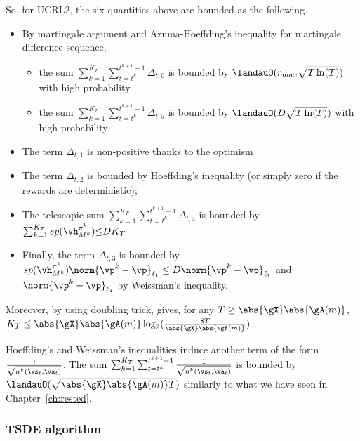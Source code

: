 So, for UCRL2, the six quantities above are bounded as the following.
\begin{itemize}
    \item By martingale argument and Azuma-Hoeffding's inequality for martingale difference sequence,
        \begin{itemize}
            \item the sum $\sum_{k=1}^{K_T}\sum_{t=t^k}^{t^{k+1}-1}\Delta_{t,0}$ is bounded by $\landauO(r_{max}\sqrt{T\ln(T)})$ with high probability
            \item the sum $\sum_{k=1}^{K_T}\sum_{t=t^k}^{t^{k+1}-1}\Delta_{t,5}$ is bounded by $\landauO(D\sqrt{T\ln(T)})$ with high probability
        \end{itemize}
    \item \label{it:optimism} The term $\Delta_{t,1}$ is non-positive thanks to the optimism
    \item The term $\Delta_{t,2}$ is bounded by Hoeffding's inequality (or simply zero if the rewards are deterministic);
    \item The telescopic sum $\sum_{k=1}^{K_T}\sum_{t=t^k}^{t^{k+1}-1} \Delta_{t,4}$ is bounded by $\sum_{k=1}^{K_T} sp(\vh^{\pi^k}_{M^k}){\le} DK_T$
    \item Finally, the term $\Delta_{t,3}$ is bounded by $sp(\vh^{\pi^k}_{M^k}) \norm{\vp^k-\vp}_{\ell_1}\le D\norm{\vp^k-\vp}_{\ell_1}$ and $\norm{\vp^k-\vp}_{\ell_1}$ by Weissman's inequality.
\end{itemize}
Moreover, by using doubling trick, \cite[Proposition~18]{jaksch2010near} gives, for any $T\ge \abs{\gX}\abs{\gA(m)}$, $K_T\le \abs{\gX}\abs{\gA(m)}\log_2(\frac{8T}{\abs{\gX}\abs{\gA(m)}})$.

Hoeffding's and Weissman's inequalities induce another term of the form $\frac{1}{\sqrt{n^k(\vs_t,\va_t)}}$.
The sum $\sum_{k=1}^{K_T}\sum_{t=t^k}^{t^{k+1}-1}\frac{1}{\sqrt{n^k(\vs_t,\va_t)}}$ is bounded by $\landauO(\sqrt{\abs{\gX}\abs{\gA(m)}T})$ similarly to what we have seen in Chapter~\ref{ch:rested}. %

\subsubsection{TSDE algorithm}


